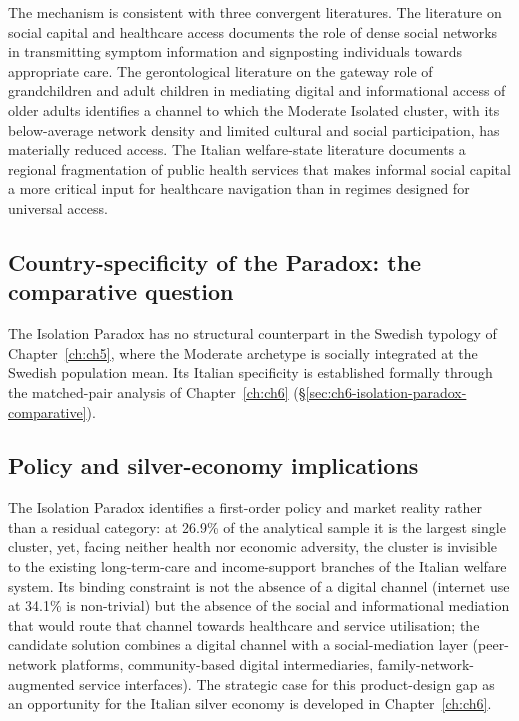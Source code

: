 The mechanism is consistent with three convergent literatures. The literature on social capital and healthcare access \citep{berkmankawachi2000} documents the role of dense social networks in transmitting symptom information and signposting individuals towards appropriate care. The gerontological literature on the gateway role of grandchildren and adult children in mediating digital and informational access of older adults \citep{quanhaase2017} identifies a channel to which the Moderate Isolated cluster, with its below-average network density and limited cultural and social participation, has materially reduced access. The Italian welfare-state literature \citep{loscalzo2009} documents a regional fragmentation of public health services that makes informal social capital a more critical input for healthcare navigation than in regimes designed for universal access.

\subsection{Country-specificity of the Paradox: the comparative question}
\label{sec:ch4-isolation-italian-only}

The Isolation Paradox has no structural counterpart in the Swedish typology of Chapter~\ref{ch:ch5}, where the Moderate archetype is socially integrated at the Swedish population mean. Its Italian specificity is established formally through the matched-pair analysis of Chapter~\ref{ch:ch6} (\S\ref{sec:ch6-isolation-paradox-comparative}).

\subsection{Policy and silver-economy implications}
\label{sec:ch4-isolation-implications}

The Isolation Paradox identifies a first-order policy and market reality rather than a residual category: at 26.9\% of the analytical sample it is the largest single cluster, yet, facing neither health nor economic adversity, the cluster is invisible to the existing long-term-care and income-support branches of the Italian welfare system. Its binding constraint is not the absence of a digital channel (internet use at 34.1\% is non-trivial) but the absence of the social and informational mediation that would route that channel towards healthcare and service utilisation; the candidate solution combines a digital channel with a social-mediation layer (peer-network platforms, community-based digital intermediaries, family-network-augmented service interfaces). The strategic case for this product-design gap as an opportunity for the Italian silver economy is developed in Chapter~\ref{ch:ch6}.

